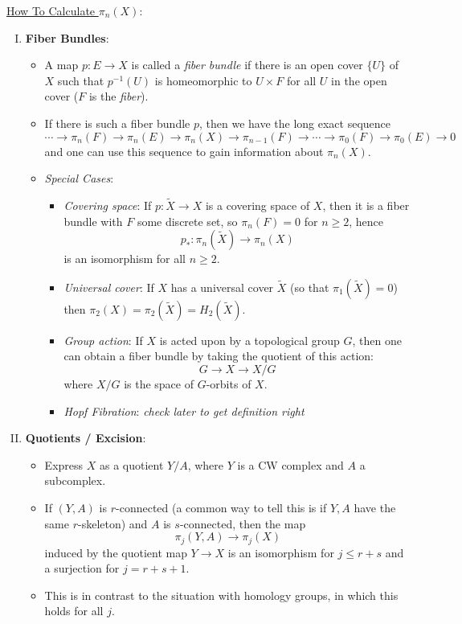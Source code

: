 \documentclass{amsart}
\begin{document}
	\underline{How To Calculate $\pi_n(X)$}: 
	\begin{enumerate}[(I)]
		\item \textbf{Fiber Bundles}:
		\begin{itemize}
			\item A map $p:E\to X$ is called a \textit{fiber bundle} if there is an open cover $\{U\}$ of $X$ such that $p^{-1}(U)$ is homeomorphic to $U\times F$ for all $U$ in the open cover ($F$ is the \textit{fiber}).
			\item If there is such a fiber bundle $p$, then we have the long exact sequence
			$$
			\cdots \to \pi_n(F)\to \pi_n(E)\to \pi_n(X) \to \pi_{n-1}(F)\to \cdots \to \pi_0(F)\to \pi_0(E)\to 0
			$$
			and one can use this sequence to gain information about $\pi_n(X)$.
			\item \textit{Special Cases}:
			\begin{itemize}
				\item \textit{Covering space}: If $p:\tilde{X}\to X$ is a covering space of $X$, then it is a fiber bundle with $F$ some discrete set, so $\pi_n(F)=0$ for $n\geq 2$, hence
				$$p_*:\pi_n(\tilde{X})\to \pi_n(X)$$
				is an isomorphism for all $n\geq 2$.
				\item \textit{Universal cover}: If $X$ has a universal cover $\tilde{X}$ (so that $\pi_1(\tilde{X})=0$) then $\pi_2(X)=\pi_2(\tilde{X})=H_2(\tilde{X})$.
				\item \textit{Group action}: If $X$ is acted upon by a topological group $G$, then one can obtain a fiber bundle by taking the quotient of this action:
				$$
				G \to X\to X/G
				$$
				where $X/G$ is the space of $G$-orbits of $X$.
				\item \textit{Hopf Fibration}: \textit{check later to get definition right}
			\end{itemize}
		\end{itemize}
		\item \textbf{Quotients / Excision}:
		\begin{itemize}
			\item Express $X$ as a quotient $Y/A$, where $Y$ is a CW complex and $A$ a subcomplex.
			\item If $(Y,A)$ is $r$-connected (a common way to tell this is if $Y,A$ have the same $r$-skeleton) and $A$ is $s$-connected, then the map
			$$
			\pi_j(Y,A)\to \pi_j(X)
			$$
			induced by the quotient map $Y\to X$ is an isomorphism for $j\leq r+s$ and a surjection for $j=r+s+1$.
			\item This is in contrast to the situation with homology groups, in which this holds for all $j$.

\end{itemize}
\end{enumerate}
\end{document}
